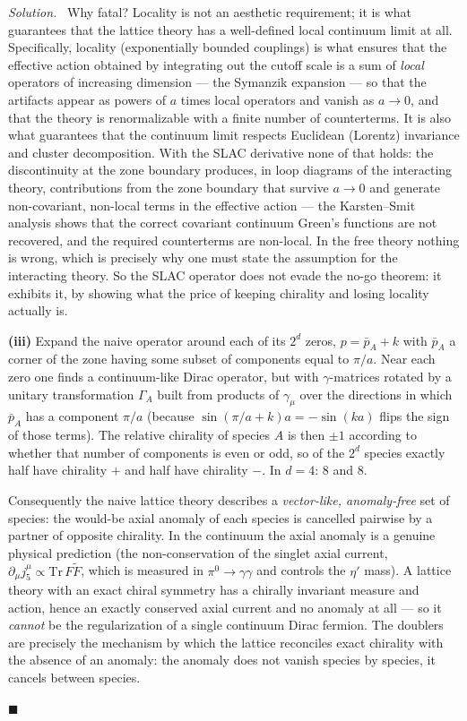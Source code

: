 \documentclass[11pt]{article}
\newenvironment{solution}{\par\smallskip\noindent\textit{Solution.}\ }{\hfill$\blacksquare$\par\smallskip}
\begin{document}
\begin{solution}
Why fatal? Locality is not an aesthetic requirement; it is what guarantees that the lattice theory has a well-defined local continuum limit at all. Specifically, locality (exponentially bounded couplings) is what ensures that the effective action obtained by integrating out the cutoff scale is a sum of \emph{local} operators of increasing dimension --- the Symanzik expansion --- so that the artifacts appear as powers of $a$ times local operators and vanish as $a\to0$, and that the theory is renormalizable with a finite number of counterterms. It is also what guarantees that the continuum limit respects Euclidean (Lorentz) invariance and cluster decomposition. With the SLAC derivative none of that holds: the discontinuity at the zone boundary produces, in loop diagrams of the interacting theory, contributions from the zone boundary that survive $a\to0$ and generate non-covariant, non-local terms in the effective action --- the Karsten--Smit analysis shows that the correct covariant continuum Green's functions are not recovered, and the required counterterms are non-local. In the free theory nothing is wrong, which is precisely why one must state the assumption for the interacting theory. So the SLAC operator does not evade the no-go theorem: it exhibits it, by showing what the price of keeping chirality and losing locality actually is.

\textbf{(iii)} Expand the naive operator around each of its $2^d$ zeros, $p = \bar p_A + k$ with $\bar p_A$ a corner of the zone having some subset of components equal to $\pi/a$. Near each zero one finds a continuum-like Dirac operator, but with $\gamma$-matrices rotated by a unitary transformation $\Gamma_A$ built from products of $\gamma_\mu$ over the directions in which $\bar p_A$ has a component $\pi/a$ (because $\sin(\pi/a + k)a = -\sin(ka)$ flips the sign of those terms). The relative chirality of species $A$ is then $\pm1$ according to whether that number of components is even or odd, so of the $2^d$ species exactly half have chirality $+$ and half have chirality $-$. In $d=4$: $8$ and $8$.

Consequently the naive lattice theory describes a \emph{vector-like, anomaly-free} set of species: the would-be axial anomaly of each species is cancelled pairwise by a partner of opposite chirality. In the continuum the axial anomaly is a genuine physical prediction (the non-conservation of the singlet axial current, $\partial_\mu j^\mu_5 \propto \mathrm{Tr}\,F\tilde F$, which is measured in $\pi^0 \to \gamma\gamma$ and controls the $\eta'$ mass). A lattice theory with an exact chiral symmetry has a chirally invariant measure and action, hence an exactly conserved axial current and no anomaly at all --- so it \emph{cannot} be the regularization of a single continuum Dirac fermion. The doublers are precisely the mechanism by which the lattice reconciles exact chirality with the absence of an anomaly: the anomaly does not vanish species by species, it cancels between species.


\end{solution}
\end{document}
